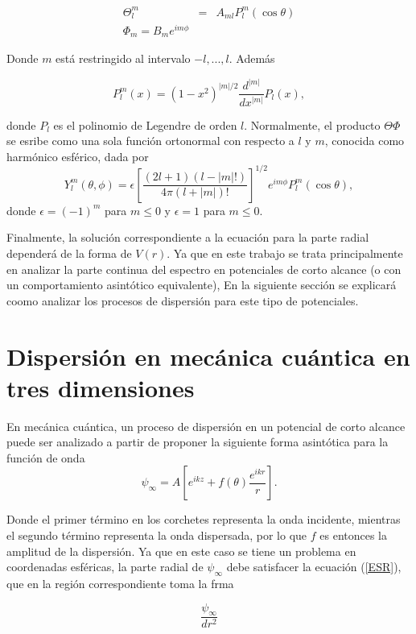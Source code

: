 \begin{eqnarray*}
	\Theta^m_l & = & A_{ml} P^m_l(\cos{\theta})
	\\
	\Phi_m =B_m  e^{i m \phi}
\end{eqnarray*}

Donde $m$ está restringido al intervalo $-l, ... ,l$. Además

\begin{equation*}
	P^m_l(x) = (1-x^2)^{|m|/2} \frac{d^{|m|}}{dx^{|m|}} P_l(x),
\end{equation*}

donde $P_l$ es el polinomio de Legendre de orden $l$. Normalmente, el producto $\Theta \Phi$ se esribe como una sola función ortonormal con respecto a $l$ y $m$, conocida como harmónico esférico, dada por
\begin{equation*}
Y^m_l(\theta,\phi) = \epsilon \left[ \frac{(2l + 1)(l - |m|!)}{4 \pi (l + |m|)!}\right]^{1/2} e^{i m \phi}P^m_l(\cos{\theta}),
\end{equation*}
donde $\epsilon=(-1)^m$ para $m \le 0$ y $\epsilon=1$ para $m \le 0$.

Finalmente, la solución correspondiente a la ecuación para la parte radial dependerá de la forma de $V(r)$.
Ya que en este trabajo se trata principalmente en analizar la parte continua del espectro en potenciales de corto alcance (o con un comportamiento asintótico equivalente), En la siguiente sección se explicará coomo analizar los procesos de dispersión para este tipo de potenciales.



\section{Dispersión en mecánica cuántica en tres dimensiones}

En mecánica cuántica, un proceso de dispersión en un potencial de corto alcance puede ser analizado a partir de proponer la siguiente forma asintótica para la función de onda
\begin{equation}
	\psi_{\infty} = A \left[e^{i k z} + f(\theta)  \frac{e^{i k r}}{r} \right]. \label{FAD}
\end{equation}

Donde el primer término en los corchetes representa la onda incidente, mientras el segundo término representa la onda dispersada, por lo que $f$ es entonces la amplitud de la dispersión. Ya que en este caso se tiene un problema en coordenadas esféricas, la parte radial de $\psi_\infty$ debe satisfacer la ecuación (\ref{ESR}), que en la región correspondiente toma la frma 

\begin{equation}
\frac{\psi_{\infty}}{dr^2}
\end{equation}


